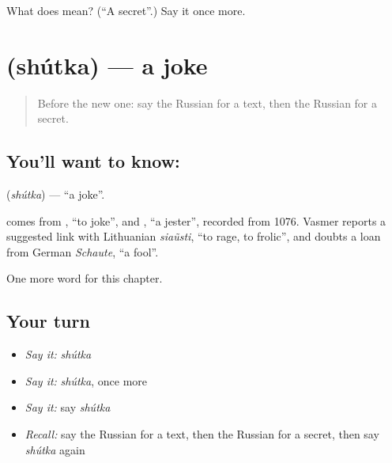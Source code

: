 \begin{tcolorbox}[breakable,colback=teal!4,colframe=teal!35!black,title={Before you move on}]
What does  mean? (\textquotedblleft{}A secret\textquotedblright{}.) Say it once more.
\end{tcolorbox}
\section[\texorpdfstring{\ru{шутка} (shútka)}{шутка (shútka)}]{ (shútka) — a joke}

\label{lesson:RU-C200-shutka}



\begin{quote}
Before the new one: say the Russian for a text, then the Russian for a secret.
\end{quote}

\subsection*{You'll want to know: }
\textbf{} (\emph{shútka}) — \textquotedblleft{}a joke\textquotedblright{}.

\begin{cousinweb}
\textbf{} comes from \emph{}, \textquotedblleft{}to joke\textquotedblright{}, and \emph{}, \textquotedblleft{}a jester\textquotedblright{}, recorded from 1076. Vasmer reports a suggested link with Lithuanian \emph{siaũsti}, \textquotedblleft{}to rage, to frolic\textquotedblright{}, and doubts a loan from German \emph{Schaute}, \textquotedblleft{}a fool\textquotedblright{}.
\end{cousinweb}

\begin{grammarlens}[title={What you've built}]
One more word for this chapter.
\end{grammarlens}

\subsection*{Your turn}
\begin{itemize}
\raggedright
  \item \emph{Say it:} \emph{shútka}
  \item \emph{Say it:} \emph{shútka}, once more
  \item \emph{Say it:} say \emph{shútka}
  \item \emph{Recall:} say the Russian for a text, then the Russian for a secret, then say \emph{shútka} again
\end{itemize}

